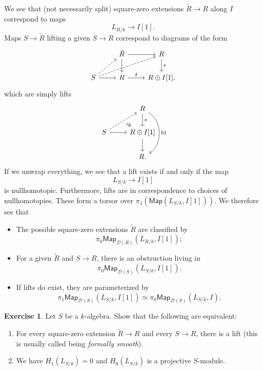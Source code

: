 \documentclass[10pt, oneside]{memoir}
\theoremstyle{definition}
\newtheorem{exer}[thm]{Exercise}
\theoremstyle{remark}
\theoremstyle{plain}
\theoremstyle{definition}
\theoremstyle{remark}
\newcommand{\mc}[1]{\mathcal{#1}}
\newcommand{\mr}[1]{\mathrm{#1}}
\newcommand{\ms}[1]{\mathsf{#1}}
\newcommand{\1}{\mathbf{1}}
\newcommand{\2}{\mathbf{2}}
\newcommand{\3}{\mathbf{3}}
\begin{document}
We see that (not necessarily split) square-zero extensions $\tilde{R} \to R$ along $I$ correspond to maps
\[ L_{R/k} \to I[1]. \]
Maps $S \to \tilde{R}$ lifting a given $S \to R$ correspond to diagrams of the form
\begin{equation*}
\begin{tikzcd}
    & \tilde{R} \ar{r} \ar{d} & R \ar{d}{s} \\
    S \ar[dashrightarrow]{ur} \ar[dashrightarrow]{urr} \ar{r} & R \ar{r}{\delta} & R \oplus I[1],
\end{tikzcd}
\end{equation*}
which are simply lifts
\begin{equation*}
\begin{tikzcd}
    & R \ar{d}{s} \ar[bend left=60]{dd}{\mr{Id}} \\
    S \ar[dashrightarrow,""{swap,name=L}]{ur} \ar{r} & R \oplus I[1] \ar{d} \ar[Leftarrow, to=L] \\
    & R.
\end{tikzcd}
\end{equation*}
If we unwrap everything, we see that a lift exists if and only if the map
\[ L_{S/k} \to I[1] \]
is nullhomotopic. Furthermore, lifts are in correspondence to choices of nullhomotopies. These form a torsor over $\pi_1(\ms{Map}(L_{S/k}, I[1]))$. We therefore see that
\begin{itemize}
    \item The possible square-zero extensions $\tilde{R}$ are classified by
    \[ \pi_0 \ms{Map}_{\mc{D}(R)} (L_{R/k}, I[1]); \]
    \item For a given $\tilde{R}$ and $S \to R$, there is an obstruction living in
    \[ \pi_0 \ms{Map}_{\mc{D}(S)} (L_{S/k}, I[1]). \]
    \item If lifts do exist, they are parameterized by
    \[ \pi_1 \ms{Map}_{\mc{D}(S)} (L_{S/k}, I[1]) \simeq \pi_0 \ms{Map}_{\mc{D}(S)}(L_{S/k}, I). \]
\end{itemize}

\begin{exer}
    Let $S$ be a $k$-algebra. Show that the following are equivalent:
    \begin{enumerate}
        \item For every square-zero extension $\tilde{R} \to R$ and every $S \to R$, there is a lift (this is usually called being \textit{formally smooth}).
        \item We have $H_1(L_{S/k})= 0$ and $H_0(L_{S/k})$ is a projective $S$-module.
    \end{enumerate}
\end{exer}
\end{document}
